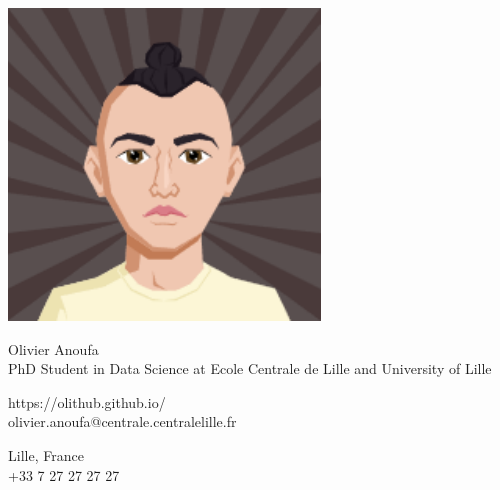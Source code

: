 \documentclass{article}
\begin{document}
\centering \includegraphics[width=.2\linewidth]{logo}\\[5pt]
\parbox{2in}{\Large \centering Olivier Anoufa\\[1pt]
\normalsize PhD Student in Data Science at Ecole Centrale de Lille and University of Lille}

\vfill
\raggedright
\begin{multicols}{2}
https://olithub.github.io/\\
olivier.anoufa@centrale.centralelille.fr

\columnbreak
\raggedleft
Lille, France\\
+33 7 27 27 27 27%
\end{multicols}%
\end{document}
